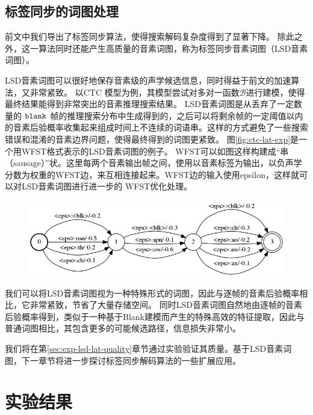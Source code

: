 \subsection{标签同步的词图处理}
\label{chap:lsd-lsd-lattice}

前文中我们导出了标签同步算法，使得搜索解码复杂度得到了显著下降。
除此之外，这一算法同时还能产生高质量的音素词图，称为标签同步音素词图（LSD音素词图）。

LSD音素词图可以很好地保存音素级的声学候选信息，同时得益于前文的加速算法，又非常紧致。
%
以CTC 模型为例，其模型尝试对多对一函数$\mathcal{B}$进行建模，使得最终结果能得到非常突出的音素推理搜索结果。
LSD音素词图是从丢弃了一定数量的 $\tt blank$ 帧的推理搜索分布中生成得到的，之后可以将剩余帧的一定阈值以内的音素后验概率收集起来组成时间上不连续的词语串。这样的方式避免了一些搜索错误和混淆的音素边界问题，使得最终得到的词图更紧致。
%
图\ref{fig:ctc-lat-exp}是一个用WFST格式表示的LSD音素词图的例子。
WFST可以如图这样构建成“串（sausage）”状。这里每两个音素输出帧之间，使用以音素标签为输出，以负声学分数为权重的WFST边，来互相连接起来。WFST边的输入使用epsilon，这样就可以对LSD音素词图进行进一步的 WFST优化处理。

\begin{figure}[!htp]
  \centering
    \captionstyle{\centering}
    \includegraphics[width=\textwidth]{figure/ctc_lat.png}
\end{figure}

我们可以将LSD音素词图视为一种特殊形式的词图，因此与逐帧的音素后验概率相比，它非常紧致，节省了大量存储空间。
同时LSD音素词图自然地由逐帧的音素后验概率得到，类似于一种基于Blank建模而产生的特殊高效的特征提取，因此与普通词图相比，其包含更多的可能候选路径，信息损失非常小。

我们将在第\ref{sec:exp-lsd-lat-quality}章节通过实验验证其质量。基于LSD音素词图，下一章节将进一步探讨标签同步解码算法的一些扩展应用。

\section{实验结果}
\label{chap:lsd-exp}

